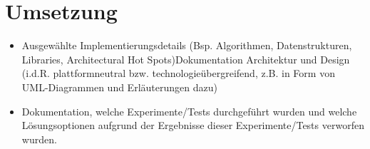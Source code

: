 \section{Umsetzung}

\begin{itemize}	
	\item Ausgewählte Implementierungsdetails (Bsp. Algorithmen, Datenstrukturen, Libraries, Architectural Hot Spots)Dokumentation Architektur und Design (i.d.R. plattformneutral bzw. technologieübergreifend, z.B. in Form von UML-Diagrammen und Erläuterungen dazu) 
	\item Dokumentation, welche Experimente/Tests durchgeführt wurden und welche Lösungsoptionen aufgrund der Ergebnisse dieser Experimente/Tests verworfen wurden. 
\end{itemize}